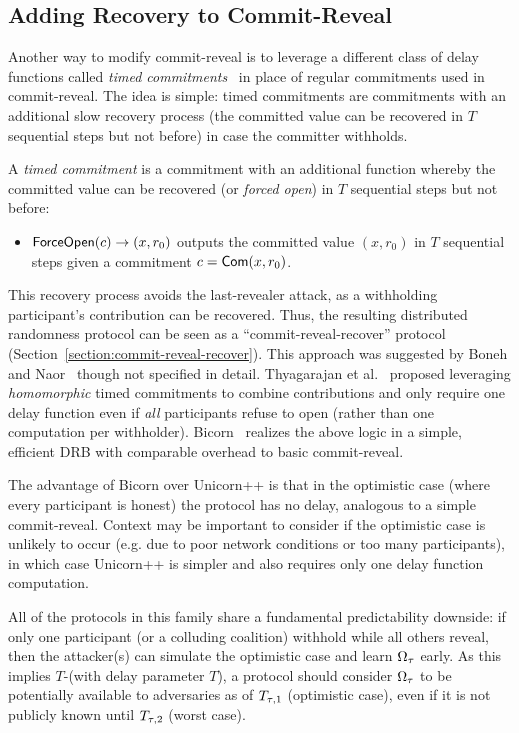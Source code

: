 \subsection{Adding Recovery to Commit-Reveal}
Another way to modify commit-reveal is to leverage a different class of delay functions called \textit{timed commitments}~\cite{boneh2000timed} in place of regular commitments used in commit-reveal.
The idea is simple: timed commitments are commitments with an additional slow recovery process (the committed value can be recovered in $T$ sequential steps but not before) in case the committer withholds.

\begin{definition}
A \textit{timed commitment} is a commitment with an additional function whereby the committed value can be recovered (or \emph{forced open}) in $T$ sequential steps but not before:
\begin{itemize}
\item $\mathsf{ForceOpen}(c) \rightarrow (x, r_0)$ outputs the committed value $(x, r_0)$ in $T$ sequential steps given a commitment $c = \mathsf{Com}(x, r_0)$.
\end{itemize}
\end{definition}

This recovery process avoids the last-revealer attack, as a withholding participant's contribution can be recovered. Thus, the resulting distributed randomness protocol can be seen as a ``commit-reveal-recover'' protocol (Section~\ref{section:commit-reveal-recover}).
This approach was suggested by Boneh and Naor~\cite{boneh2000timed} though not specified in detail.
Thyagarajan et al.~\cite{thyagarajan2021efficient} proposed leveraging \textit{homomorphic} timed commitments to combine contributions and only require one delay function even if \emph{all} participants refuse to open (rather than one computation per withholder).
Bicorn~\cite{choi2023bicorn} realizes the above logic in a simple, efficient DRB with comparable overhead to basic commit-reveal.

The advantage of Bicorn over Unicorn++ is that in the optimistic case (where every participant is honest) the protocol has no delay, analogous to a simple commit-reveal.
Context may be important to consider if the optimistic case is unlikely to occur (e.g. due to poor network conditions or too many participants), in which case Unicorn++ is simpler and also requires only one delay function computation.

All of the protocols in this family share a fundamental predictability downside: if only one participant (or a colluding coalition) withhold while all others reveal, then the attacker(s) can simulate the optimistic case and learn $\Omega_\tau$ early. As this implies $T$-\intraunpredictability (with delay parameter $T$), a protocol should consider $\Omega_\tau$ to be potentially available to adversaries as of $T_{\tau, 1}$ (optimistic case), even if it is not publicly known until $T_{\tau, 2}$ (worst case).

